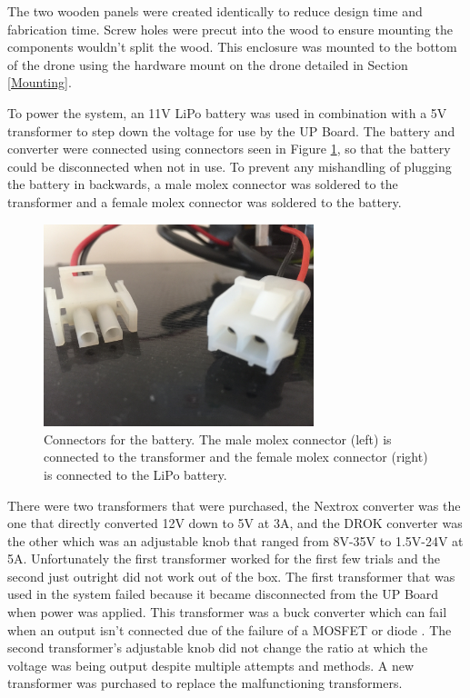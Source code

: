 The two wooden panels were created identically to reduce design time and fabrication time. Screw holes were precut into the wood to ensure mounting the components wouldn't split the wood. This enclosure was mounted to the bottom of the drone using the hardware mount on the drone detailed in Section \ref{Mounting}. \par

To power the system, an 11V LiPo battery was used in combination with a 5V transformer to step down the voltage for use by the UP Board. The battery and converter were connected using connectors seen in Figure \ref{fig:connectors}, so that the battery could be disconnected when not in use. To prevent any mishandling of plugging the battery in backwards, a male molex connector was soldered to the transformer and a female molex connector was soldered to the battery.
\begin{figure}[ht!]
	\centering
	\includegraphics[width=0.70\textwidth]{img/connectors.JPG}
	\caption{Connectors for the battery. The male molex connector (left) is connected to the transformer and the female molex connector (right) is connected to the LiPo battery.}
	\label{fig:connectors}
\end{figure}\par
There were two transformers that were purchased, the Nextrox converter was the one that directly converted 12V down to 5V at 3A, and the DROK converter was the other which was an adjustable knob that ranged from 8V-35V to 1.5V-24V at 5A. Unfortunately the first transformer worked for the first few trials and the second just outright did not work out of the box. The first transformer that was used in the system failed because it became disconnected from the UP Board when power was applied. This transformer was a buck converter which can fail when an output isn't connected due of the failure of a MOSFET or diode \cite{power_book}. The second transformer's adjustable knob did not change the ratio at which the voltage was being output despite multiple attempts and methods. A new transformer was purchased to replace the malfunctioning transformers. \par

